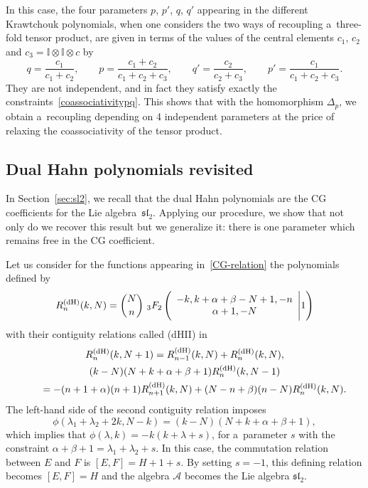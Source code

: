 \documentclass[10pt,a4paper]{amsart}
\numberwithin{equation}{section}
\theoremstyle{definition}
\begin{document}
In this case, the four parameters $p$, $p'$, $q$, $q'$ appearing in the different Krawtchouk polynomials, when one considers the two ways of recoupling a~three-fold tensor product, are given in terms of the values of the central elements $c_1$, $c_2$ and $c_3=\mathbb{I}\otimes\mathbb{I}\otimes c$ by
\[q=\frac{c_1}{c_1+c_2}, \qquad p=\frac{c_1+c_2}{c_1+c_2+c_3}, \qquad q'=\frac{c_2}{c_2+c_3}, \qquad p'=\frac{c_1}{c_1+c_2+c_3}.\]
They are not independent, and in fact they satisfy exactly the constraints~\eqref{coassociativitypq}. This shows that with the homomorphism $\Delta_p$, we obtain a~recoupling depending on 4 independent parameters at the price of relaxing the coassociativity of the tensor product.

\subsection{Dual Hahn polynomials revisited}

In Section~\ref{sec:sl2}, we recall that the dual Hahn polynomials are the CG coefficients for the Lie algebra~$\mathfrak{sl}_2$.
Applying our procedure, we show that not only do we recover this result but we generalize it: there is one parameter which remains free in the CG coefficient.

Let us consider for the functions appearing in~\eqref{CG-relation} the polynomials defined by
\[
R^{\rm (dH)}_n(k,N)=\binom{N}{n}\ {}_3F_2\left(\begin{array}{c} -k, k+\alpha+\beta-N+1, -n \\ \alpha+1, -N\end{array}\Bigg\vert 1\right)
\]
with their contiguity relations called (dHII) in~\cite{contiguity}
\begin{gather*}
R^{\rm (dH)}_n(k,N+1)=R^{\rm (dH)}_{n-1}(k,N)+R^{\rm (dH)}_n(k,N),\\
(k-N)(N+k+\alpha+\beta+1)R^{\rm (dH)}_n(k,N-1)\nonumber\\
\qquad=-(n+1+\alpha)(n+1)R^{\rm (dH)}_{n+1}(k,N)+(N-n+\beta)(n-N)R^{\rm (dH)}_n(k,N).
\end{gather*}
The left-hand side of the second contiguity relation imposes
\[\phi(\lambda_1+\lambda_2+2k,N-k)=(k-N)(N+k+\alpha+\beta+1),\]
which implies that
$\phi(\lambda,k)=-k(k+\lambda+s)$,
for a~parameter $s$ with the constraint
$\alpha+\beta+1=\lambda_1+\lambda_2+s$.
In this case, the commutation relation between $E$ and $F$ is
$ [E,F]=H+1+s$.
By setting $s=-1$, this defining relation becomes $[E,F]=H$ and the algebra $\mathcal{A}$ becomes the Lie algebra $\mathfrak{sl}_2$.
\end{document}
